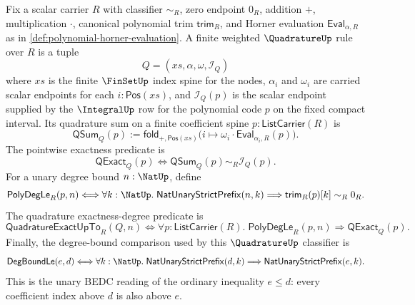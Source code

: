 \begin{definition}
\label{def:quadrature-finite-weighted-exactness-degree}
Fix a scalar carrier $R$ with classifier $\sim_R$, zero endpoint $0_R$, addition $+$, multiplication $\cdot$, canonical polynomial trim $\mathsf{trim}_R$, and Horner evaluation $\mathsf{Eval}_{\alpha,R}$ as in \autoref{def:polynomial-horner-evaluation}. A finite weighted $\QuadratureUp$ rule over $R$ is a tuple
$$
Q=(xs,\alpha,\omega,\mathcal I_Q)
$$
where $xs$ is the finite $\FinSetUp$ index spine for the nodes, $\alpha_i$ and $\omega_i$ are carried scalar endpoints for each $i:\mathsf{Pos}(xs)$, and $\mathcal I_Q(p)$ is the scalar endpoint supplied by the $\IntegralUp$ row for the polynomial code $p$ on the fixed compact interval. Its quadrature sum on a finite coefficient spine $p:\mathsf{ListCarrier}(R)$ is
$$
\mathsf{QSum}_Q(p):=
\mathsf{fold}_{+,\mathsf{Pos}(xs)}
\bigl(i\mapsto \omega_i\cdot\mathsf{Eval}_{\alpha_i,R}(p)\bigr).
$$
The pointwise exactness predicate is
$$
\mathsf{QExact}_Q(p)\Longleftrightarrow
\mathsf{QSum}_Q(p)\sim_R\mathcal I_Q(p).
$$
For a unary degree bound $n:\NatUp$, define
$$
\mathsf{PolyDegLe}_R(p,n)
\Longleftrightarrow
\forall k:\NatUp.\;
\mathsf{NatUnaryStrictPrefix}(n,k)
\Longrightarrow
\mathsf{trim}_R(p)[k]\sim_R0_R.
$$
The quadrature exactness-degree predicate is
$$
\mathsf{QuadratureExactUpTo}_R(Q,n)
\Longleftrightarrow
\forall p:\mathsf{ListCarrier}(R).\;
\mathsf{PolyDegLe}_R(p,n)
\Longrightarrow
\mathsf{QExact}_Q(p).
$$
Finally, the degree-bound comparison used by this $\QuadratureUp$ classifier is
$$
\mathsf{DegBoundLe}(e,d)
\Longleftrightarrow
\forall k:\NatUp.\;
\mathsf{NatUnaryStrictPrefix}(d,k)
\Longrightarrow
\mathsf{NatUnaryStrictPrefix}(e,k).
$$
This is the unary BEDC reading of the ordinary inequality $e\leq d$: every coefficient index above $d$ is also above $e$.
\end{definition}

